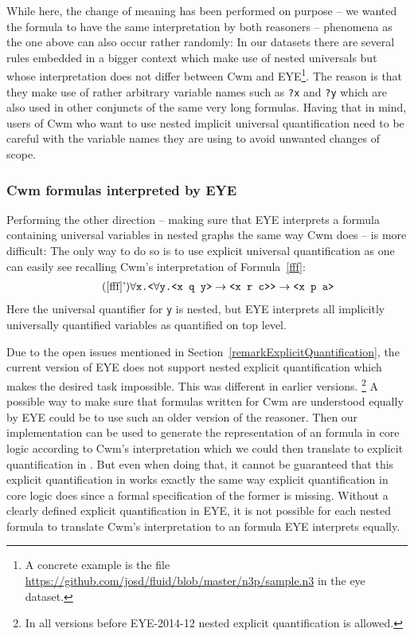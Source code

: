 While here, the change of meaning has been performed on purpose -- we wanted the formula to have the same interpretation by both reasoners --
phenomena as the one above can also occur rather randomly: In our datasets there are several rules embedded in a bigger context which make use of nested universals but whose
 interpretation does not differ between Cwm and EYE\footnote{A concrete example is the file \url{https://github.com/josd/fluid/blob/master/n3p/sample.n3} in the eye dataset.}. 
 The reason is that they make use of rather arbitrary variable names such as \texttt{?x} and \texttt{?y} 
which are also used in other conjuncts of the same very long formulas. Having that in mind, users of Cwm who want to use nested implicit universal quantification need to be careful
with the variable names they are using to avoid unwanted changes of scope.

\subsubsection{Cwm formulas interpreted by EYE}
Performing the other direction -- making sure that EYE interprets a formula containing universal variables in nested graphs the same way Cwm does -- is more difficult: 
The only way to do so is to use explicit universal quantification as one can easily see recalling Cwm's interpretation of Formula~\ref{fff}: 
\begin{multline}\tag{\ref{fff}'}
 \forall \texttt{x.}
 \texttt{<} \forall \texttt{y.<x q y>} \rightarrow \texttt{<x r c>{}>}\rightarrow\texttt{<x p a>}
\end{multline}
Here the universal quantifier for \texttt{y} is nested, but EYE interprets all implicitly universally quantified variables as quantified on top level.

Due to the open issues 
mentioned in Section~\ref{remarkExplicitQuantification}, the current version of EYE does not support nested explicit quantification which makes the desired task impossible.
This was different in earlier versions.%
\footnote{In all versions before EYE-2014-12
 nested explicit quantification is allowed.} 
A possible way to make sure that formulas written for Cwm are understood equally by EYE could be to use such an older version of the reasoner.
Then our implementation can be used to generate the representation of an \nthree formula in core logic according to Cwm's interpretation which we could then translate 
 to explicit quantification
in \nthree. But even when doing that, it cannot be guaranteed that this explicit quantification in \nthree works exactly the same way explicit quantification
in core logic does since a formal specification of the former is missing.
Without a clearly defined explicit quantification in EYE, it is not possible for each nested formula to translate Cwm's interpretation to an \nthree formula 
EYE interprets equally.


